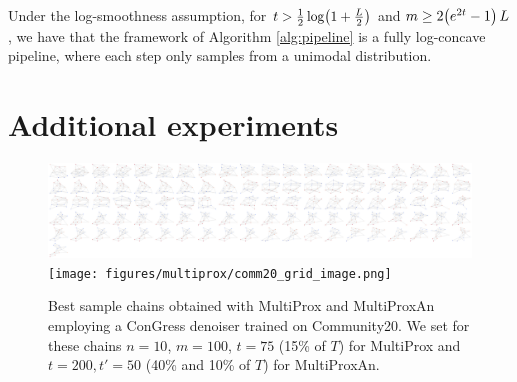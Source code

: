 \begin{theorem}
    \label{thm:logconcavepipe}
    Under the log-smoothness assumption, for $t> \frac{1}{2}\log\mathopen{}\left(1 + \frac{L}{2}\right)$ and $m \geq 2\mathopen{}\left(e^{2t} - 1\right)L$, we have that the framework of Algorithm \ref{alg:pipeline} is a fully log-concave pipeline, where each step only samples from a unimodal distribution.
\end{theorem}

\section{Additional experiments}
\label{sec:appendix_multiprox_experiments}

\begin{figure}[H]
    \centering
    \includegraphics[width=\linewidth]{figures/multiprox/comm20_grid_image_single_noise.png}
    \texttt{[image: figures/multiprox/comm20\_grid\_image.png]}
    \caption[Best sample chains obtained with MultiProx and MultiProxAn on Community20.]{Best sample chains obtained with MultiProx and MultiProxAn employing a ConGress denoiser trained on Community20. We set for these chains $n=10$, $m=100$, $t=75$ (15\% of $T$) for MultiProx and $t=200, t'=50$ (40\% and 10\% of $T$) for MultiProxAn.}
    \label{fig:comm20_extra}
\end{figure}

